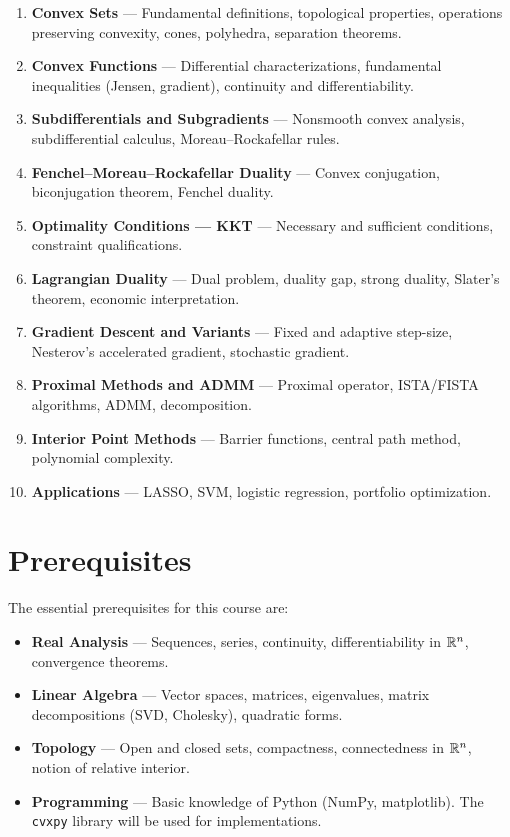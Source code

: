 \begin{enumerate}
    \item \textbf{Convex Sets} --- Fundamental definitions, topological properties,
          operations preserving convexity, cones, polyhedra, separation theorems.
    \item \textbf{Convex Functions} --- Differential characterizations,
          fundamental inequalities (Jensen, gradient), continuity and differentiability.
    \item \textbf{Subdifferentials and Subgradients} --- Nonsmooth convex analysis,
          subdifferential calculus, Moreau--Rockafellar rules.
    \item \textbf{Fenchel--Moreau--Rockafellar Duality} --- Convex conjugation,
          biconjugation theorem, Fenchel duality.
    \item \textbf{Optimality Conditions --- KKT} --- Necessary and sufficient
          conditions, constraint qualifications.
    \item \textbf{Lagrangian Duality} --- Dual problem, duality gap,
          strong duality, Slater's theorem, economic interpretation.
    \item \textbf{Gradient Descent and Variants} --- Fixed and adaptive step-size,
          Nesterov's accelerated gradient, stochastic gradient.
    \item \textbf{Proximal Methods and ADMM} --- Proximal operator,
          ISTA/FISTA algorithms, ADMM, decomposition.
    \item \textbf{Interior Point Methods} --- Barrier functions,
          central path method, polynomial complexity.
    \item \textbf{Applications} --- LASSO, SVM, logistic regression,
          portfolio optimization.
\end{enumerate}

\section*{Prerequisites}

The essential prerequisites for this course are:

\begin{itemize}
    \item \textbf{Real Analysis} --- Sequences, series, continuity, differentiability
          in $\mathbb{R}^n$, convergence theorems.
    \item \textbf{Linear Algebra} --- Vector spaces, matrices, eigenvalues,
          matrix decompositions (SVD, Cholesky), quadratic forms.
    \item \textbf{Topology} --- Open and closed sets, compactness, connectedness
          in $\mathbb{R}^n$, notion of relative interior.
    \item \textbf{Programming} --- Basic knowledge of Python (NumPy, matplotlib).
          The \texttt{cvxpy} library will be used for implementations.
\end{itemize}


